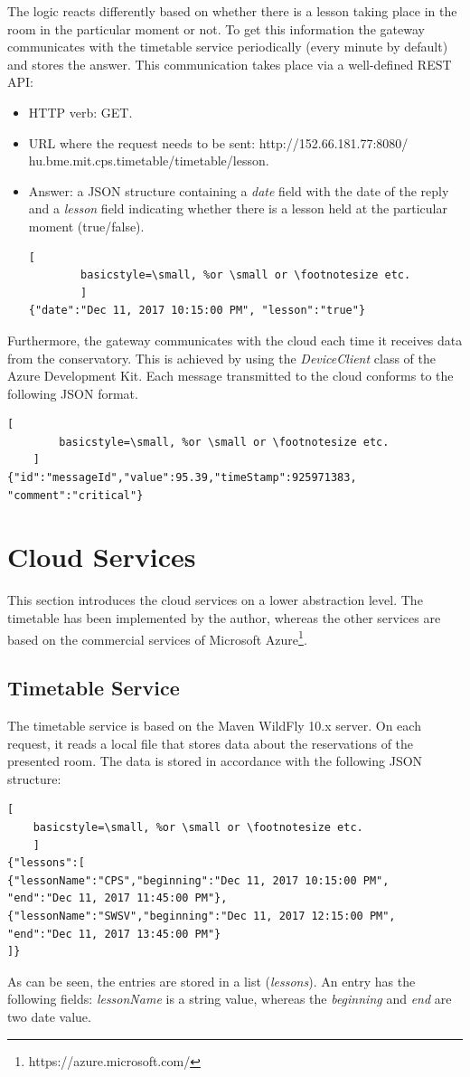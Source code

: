 \documentclass[a4paper, 11pt]{article}
\begin{document}
	The logic reacts differently based on whether there is a lesson taking place in the room in the particular moment or not. To get this information the gateway communicates with the timetable service periodically (every minute by default) and stores the answer. This communication takes place via a well-defined REST API:
	\begin{itemize}
		\item HTTP verb: GET.
		\item URL where the request needs to be sent:		
		http://152.66.181.77:8080/ \\ hu.bme.mit.cps.timetable/timetable/lesson.		
		\item Answer: a JSON structure containing a \textsl{date} field with the date of the reply and a \textsl{lesson} field indicating whether there is a lesson held at the particular moment (true/false).
		\begin{lstlisting}[
		basicstyle=\small, %or \small or \footnotesize etc.
		]
{"date":"Dec 11, 2017 10:15:00 PM", "lesson":"true"}
		\end{lstlisting}
	\end{itemize}

	Furthermore, the gateway communicates with the cloud each time it receives data from the conservatory. This is achieved by using the \textsl{DeviceClient} class of the Azure Development Kit.
	Each message transmitted to the cloud conforms to the following JSON format.
	\begin{lstlisting}[
		basicstyle=\small, %or \small or \footnotesize etc.
	]
{"id":"messageId","value":95.39,"timeStamp":925971383,
"comment":"critical"}
	\end{lstlisting}
	
	\section{Cloud Services}
	This section introduces the cloud services on a lower abstraction level. The timetable has been implemented by the author, whereas the other services are based on the commercial services of Microsoft Azure\footnote{https://azure.microsoft.com/}.
	
	\subsection{Timetable Service}
	The timetable service is based on the Maven WildFly 10.x server. On each request, it reads a local file that stores data about the reservations of the presented room. The data is stored in accordance with the following JSON structure:
	\begin{lstlisting}[
	basicstyle=\small, %or \small or \footnotesize etc.
	]
{"lessons":[
{"lessonName":"CPS","beginning":"Dec 11, 2017 10:15:00 PM",
"end":"Dec 11, 2017 11:45:00 PM"},
{"lessonName":"SWSV","beginning":"Dec 11, 2017 12:15:00 PM",
"end":"Dec 11, 2017 13:45:00 PM"}
]}
	\end{lstlisting}
	As can be seen, the entries are stored in a list (\textsl{lessons}). An entry has the following fields: \textsl{lessonName} is a string value, whereas the \textsl{beginning} and \textsl{end} are two date value.
	
\end{document}

